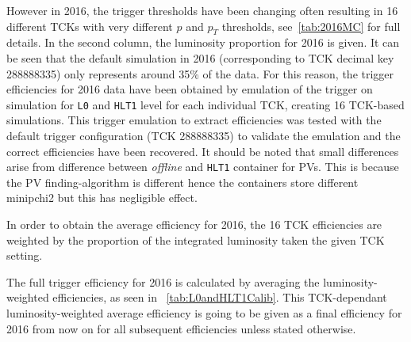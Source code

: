 However in 2016, the trigger thresholds have been changing often resulting in 16 different TCKs with very different $p$ and $p_{T}$ thresholds, see~\autoref{tab:2016MC} for full details. In the second column, the luminosity proportion for 2016 is given. It can be seen that the default simulation in 2016 (corresponding to TCK decimal key 288888335) only represents around 35\% of the data. For this reason, the trigger efficiencies for 2016 data have been obtained by emulation of the trigger on simulation for \texttt{L0} and \texttt{HLT1} level for each individual TCK, creating 16 TCK-based simulations.  This trigger emulation to extract efficiencies was tested with the default trigger configuration (TCK 288888335) to validate the emulation and the correct efficiencies have been recovered. It should be noted that small differences arise from difference between \textit{offline} and \texttt{HLT1} container for \gls{PV}s. This is because the \gls{PV} finding-algorithm is different hence the containers store different \gls{minipchi2} but this has negligible effect. %

In order to obtain the average efficiency for 2016, the 16 TCK efficiencies are weighted by the proportion of the integrated luminosity taken the given TCK setting.

The full trigger efficiency for 2016 is calculated by averaging the luminosity-weighted efficiencies, as seen in ~\autoref{tab:L0andHLT1Calib}. This TCK-dependant luminosity-weighted average efficiency is going to be given as a final efficiency for 2016 from now on for all subsequent efficiencies unless stated otherwise.  


